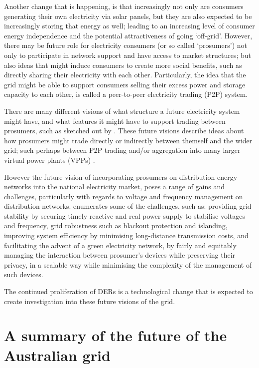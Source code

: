 Another change that is happening, is that increasingly not only are consumers generating their own electricity via solar panels, but they are also expected to be increasingly storing that energy as well; leading to an increasing level of consumer energy independence and the potential attractiveness of going `off-grid'.
However, there may be future role for electricity consumers (or so called `prosumers') not only to participate in network support and have access to market structures; but also ideas that might induce consumers to create more social benefits, such as directly sharing their electricity with each other.
Particularly, the idea that the grid might be able to support consumers selling their excess power and storage capacity to each other, is called a peer-to-peer electricity trading (P2P) system.

There are many different visions of what structure a future electricity system might have, and what features it might have to support trading between prosumers, such as sketched out by \cite{Parag2016}.
These future visions describe ideas about how prosumers might trade directly or indirectly between themself and the wider grid; such perhaps between P2P trading and/or aggregation into many larger virtual power plants (VPPs) \cite{Morstyn2018}.

However the future vision of incorporating prosumers on distribution energy networks into the national electricity market, poses a range of gains and challenges, particularly with regards to voltage and frequency management on distribution networks.
\cite{BELL2018765} enumerates some of the challenges, such as: providing grid stability by securing timely reactive and real power supply to stabilise voltages and frequency, grid robustness such as blackout protection and islanding, improving system efficiency by minimising long-distance transmission costs, and facilitating the advent of a green electricity network, by fairly and equitably managing the interaction between prosumer's devices while preserving their privacy, in a scalable way while minimising the complexity of the management of such devices.

The continued proliferation of DERs is a technological change that is expected to create investigation into these future visions of the grid.

\section{A summary of the future of the Australian grid}

